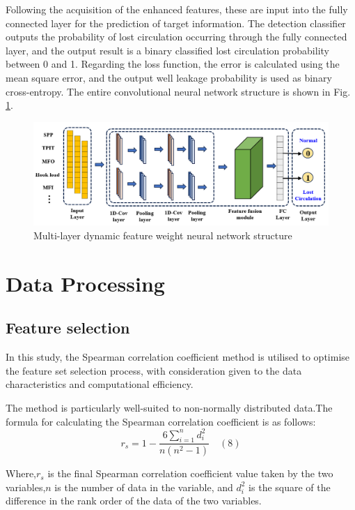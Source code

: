 \documentclass[journal,article,submit,pdftex,moreauthors]{Definitions/mdpi}
\begin{document}
Following the acquisition of the enhanced features, these are input into the fully connected layer for the prediction of target information. The detection classifier outputs the probability of lost circulation occurring through the fully connected layer, and the output result is a binary classified lost circulation probability between 0 and 1. Regarding the loss function, the error is calculated using the mean square error, and the output well leakage probability is used as binary cross-entropy. The entire convolutional neural network structure is shown in Fig. \ref{fig:Multi-layer dynamic feature weight neural network structure}.
\begin{figure}[h]
    \centering
    \includegraphics[width=0.75\linewidth]{图片/多尺度融合网络.png}
    \caption{Multi-layer dynamic feature weight neural network structure}
    \label{fig:Multi-layer dynamic feature weight neural network structure}
\end{figure}

\section{Data Processing}
\subsection{Feature selection}

In this study, the Spearman correlation coefficient method is utilised to optimise the feature set selection process, with consideration given to the data characteristics and computational efficiency.

The method is particularly well-suited to non-normally distributed data.The formula for calculating the Spearman correlation coefficient is as follows:
\[{{r}_{s}}=1-\frac{6\sum\limits_{i=1}^{n}{d_{i}^{2}}}{n\left( {{n}^{2}}-1 \right)}\quad (8)\]

Where,\({{r}_{s}}\) is the final Spearman correlation coefficient value taken by the two variables,\(n\) is the number of data in the variable, and  \(d_{i}^{2}\) is the square of the difference in the rank order of the data of the two variables.
\end{document}
